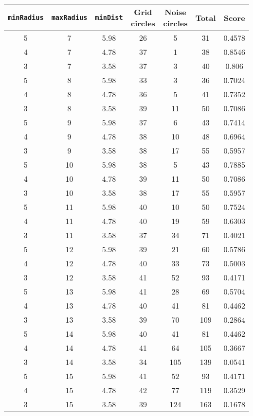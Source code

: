 \documentclass[letterpaper, 12pt]{article}
\begin{document}
\begin{longtable}{|c|c|c|c|c|c|c|}
\hline
\textbf{\texttt{minRadius}} & \textbf{\texttt{maxRadius}} & \textbf{\texttt{minDist}} & \textbf{Grid circles} & \textbf{Noise circles} & \textbf{Total} & \textbf{Score} \\
\hline
5 & 7 & 5.98 & 26 & 5 & 31 & 0.4578 \\
\hline
4 & 7 & 4.78 & 37 & 1 & 38 & 0.8546 \\
\hline
3 & 7 & 3.58 & 37 & 3 & 40 & 0.806 \\
\hline
5 & 8 & 5.98 & 33 & 3 & 36 & 0.7024 \\
\hline
4 & 8 & 4.78 & 36 & 5 & 41 & 0.7352 \\
\hline
3 & 8 & 3.58 & 39 & 11 & 50 & 0.7086 \\
\hline
5 & 9 & 5.98 & 37 & 6 & 43 & 0.7414 \\
\hline
4 & 9 & 4.78 & 38 & 10 & 48 & 0.6964 \\
\hline
3 & 9 & 3.58 & 38 & 17 & 55 & 0.5957 \\
\hline
5 & 10 & 5.98 & 38 & 5 & 43 & 0.7885 \\
\hline
4 & 10 & 4.78 & 39 & 11 & 50 & 0.7086 \\
\hline
3 & 10 & 3.58 & 38 & 17 & 55 & 0.5957 \\
\hline
5 & 11 & 5.98 & 40 & 10 & 50 & 0.7524 \\
\hline
4 & 11 & 4.78 & 40 & 19 & 59 & 0.6303 \\
\hline
3 & 11 & 3.58 & 37 & 34 & 71 & 0.4021 \\
\hline
5 & 12 & 5.98 & 39 & 21 & 60 & 0.5786 \\
\hline
4 & 12 & 4.78 & 40 & 33 & 73 & 0.5003 \\
\hline
3 & 12 & 3.58 & 41 & 52 & 93 & 0.4171 \\
\hline
5 & 13 & 5.98 & 41 & 28 & 69 & 0.5704 \\
\hline
4 & 13 & 4.78 & 40 & 41 & 81 & 0.4462 \\
\hline
3 & 13 & 3.58 & 39 & 70 & 109 & 0.2864 \\
\hline
5 & 14 & 5.98 & 40 & 41 & 81 & 0.4462 \\
\hline
4 & 14 & 4.78 & 41 & 64 & 105 & 0.3667 \\
\hline
3 & 14 & 3.58 & 34 & 105 & 139 & 0.0541 \\
\hline
5 & 15 & 5.98 & 41 & 52 & 93 & 0.4171 \\
\hline
4 & 15 & 4.78 & 42 & 77 & 119 & 0.3529 \\
\hline
3 & 15 & 3.58 & 39 & 124 & 163 & 0.1678 \\

\end{longtable}
\end{document}

